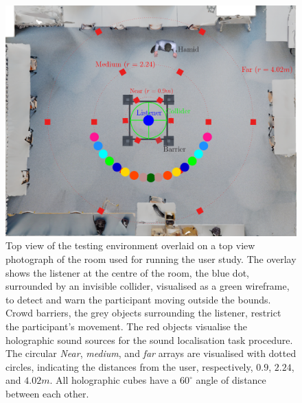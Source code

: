 \begin{figure}[htbp]
    \centering
    \includegraphics[width=1\linewidth]{7_evaluation/images/cst208topview-diagram2.png}
    \caption{Top view of the testing environment overlaid on a top view photograph of the room used for running the user study. The overlay shows the listener at the centre of the room, the blue dot, surrounded by an invisible collider, visualised as a green wireframe, to detect and warn the participant moving outside the bounds. Crowd barriers, the grey objects surrounding the listener, restrict the participant's movement. The red objects visualise the holographic sound sources for the sound localisation task procedure. The circular \emph{Near}, \emph{medium}, and \emph{far} arrays are visualised with dotted circles, indicating the distances from the user, respectively, $0.9$, $2.24$, and $4.02m$. All holographic cubes have a $60^\circ$ angle of distance between each other.}
    \label{fig:psycho-top-view}
\end{figure}


